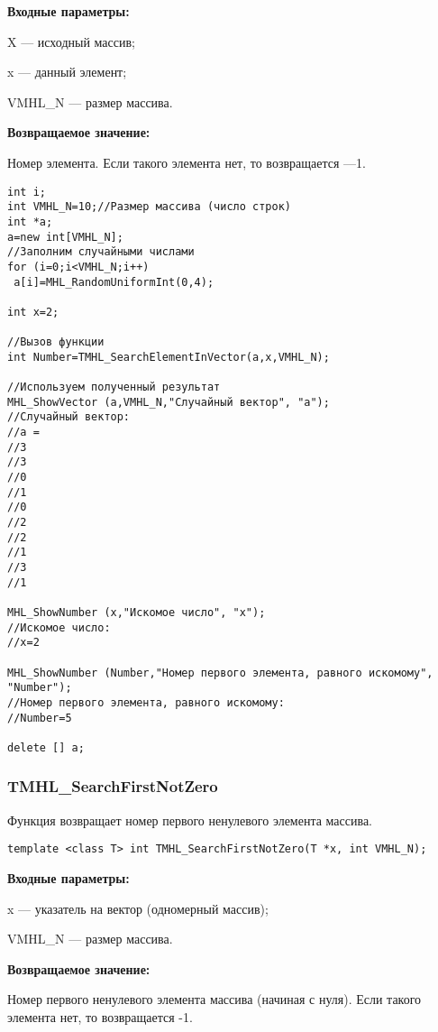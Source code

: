 \documentclass[a4paper,12pt]{article}
\begin{document}
\textbf{Входные параметры:}

X --- исходный массив;
 
x --- данный элемент;
 
VMHL\_N --- размер массива.

\textbf{Возвращаемое значение:}
 
Номер элемента. Если такого элемента нет, то возвращается ---1.


\begin{lstlisting}[label=code_use_TMHL_SearchElementInVector,caption=Пример использования]
int i;
int VMHL_N=10;//Размер массива (число строк)
int *a;
a=new int[VMHL_N];
//Заполним случайными числами
for (i=0;i<VMHL_N;i++)
 a[i]=MHL_RandomUniformInt(0,4);

int x=2;

//Вызов функции
int Number=TMHL_SearchElementInVector(a,x,VMHL_N);

//Используем полученный результат
MHL_ShowVector (a,VMHL_N,"Случайный вектор", "a");
//Случайный вектор:
//a =	
//3
//3
//0
//1
//0
//2
//2
//1
//3
//1

MHL_ShowNumber (x,"Искомое число", "x");
//Искомое число:
//x=2

MHL_ShowNumber (Number,"Номер первого элемента, равного искомому", "Number");
//Номер первого элемента, равного искомому:
//Number=5

delete [] a;
\end{lstlisting}

\subsubsection{TMHL\_SearchFirstNotZero}\label{TMHL_SearchFirstNotZero}

Функция возвращает номер первого ненулевого элемента массива.


\begin{lstlisting}[label=code_syntax_TMHL_SearchFirstNotZero,caption=Синтаксис]
template <class T> int TMHL_SearchFirstNotZero(T *x, int VMHL_N);
\end{lstlisting}

\textbf{Входные параметры:}

 x --- указатель на вектор (одномерный массив);
 
 VMHL\_N --- размер массива.

\textbf{Возвращаемое значение:}

Номер первого ненулевого элемента массива (начиная с нуля). Если такого элемента нет, то возвращается -1.
\end{document}
